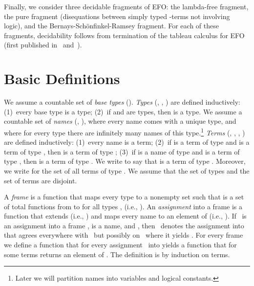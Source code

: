 Finally, we consider three decidable fragments of EFO:
the lambda-free fragment, the pure fragment
(disequations between simply typed -terms not
involving logic), and the Bernays-Sch\"onfinkel-Ramsey
fragment.  For each of these fragments, decidability
follows from termination of the tableau calculus for EFO
(first published in~\cite{BrownSmolkaBasic}
and~\cite{BrownSmolkaEFO}).

























\section{Basic Definitions}

We assume a countable set of \emph{base types}
().  \emph{Types} (, , ) are
defined inductively: (1)~every base type is a type;
(2)~if  and  are types, then 
is a type.  We assume a countable set of \emph{names}
(, ), where every name comes with a unique type,
and where for every type there are infinitely many names of this 
type.\footnote{Later we will partition names into variables and logical constants.} \emph{Terms} (, , , )
are defined inductively: (1)~every name is a term;
(2)~if  is a term of type  and  is a
term of type , then  is a term of type ;
(3)~if  is a name of type  and  is a term
of type , then  is a term of type
.  We write \emph{} to say that
 is a term of type .  Moreover, we write
\emph{} for the set of all terms of type
.  We assume that the set of types and the set of terms
are disjoint.

A \emph{frame} is a function  that maps every
type to a nonempty set such that  is
a set of total functions from  to
 for all types ,  (i.e.,
).
An
\emph{assignment} into a frame  is a function
 that extends  (i.e., ) and
maps every name  to an element of 
(i.e., ).  If~ is an
assignment into a frame ,  is a
name, and ,
then~\emph{} denotes the assignment
into  that agrees everywhere with~ but
possibly on~ where it yields .  For every frame
 we define a function \emph{} that for
every assignment~ into  yields a
function  that for some terms 
returns an element of .  The definition is
by induction on terms.

